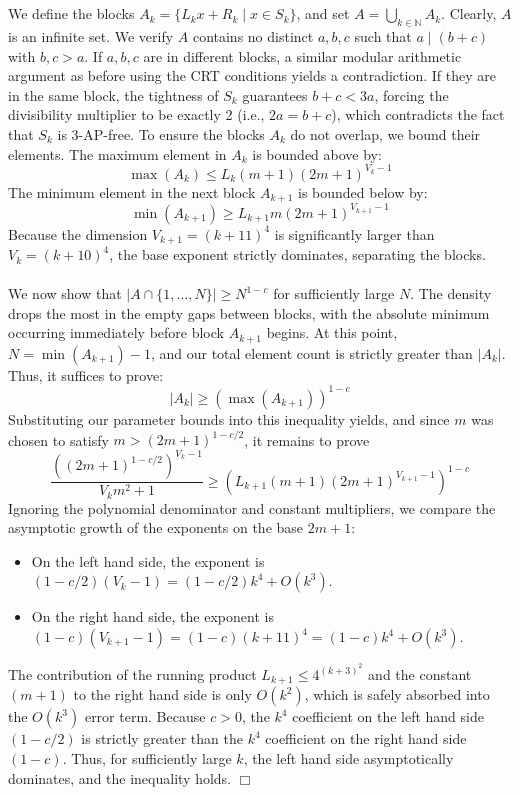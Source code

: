 \\\\
We define the blocks $A_k = \{L_kx + R_k \mid x \in S_k\}$, and set $A = \bigcup_{k \in \mathbb{N}} A_k$. Clearly, $A$ is an infinite set. We verify $A$ contains no distinct $a,b,c$ such that $a \mid (b + c)$ with $b, c > a$. If $a, b, c$ are in different blocks, a similar modular arithmetic argument as before using the CRT conditions yields a contradiction. If they are in the same block, the tightness of $S_k$ guarantees $b+c < 3a$, forcing the divisibility multiplier to be exactly 2 (i.e., $2a = b+c$), which contradicts the fact that $S_k$ is 3-AP-free. To ensure the blocks $A_k$ do not overlap, we bound their elements. The maximum element in $A_k$ is bounded above by:
$$\max(A_k) \leq L_k (m+1)(2m + 1)^{V_k - 1}$$
The minimum element in the next block $A_{k+1}$ is bounded below by:
$$\min(A_{k+1}) \geq L_{k + 1} m(2m + 1)^{V_{k + 1} - 1}$$
Because the dimension $V_{k + 1} = (k + 11)^4$ is significantly larger than $V_k = (k + 10)^4$, the base exponent strictly dominates, separating the blocks.
\\\\
We now show that $|A \cap \{1, \dots, N\}| \geq N^{1-c}$ for sufficiently large $N$. The density drops the most in the empty gaps between blocks, with the absolute minimum occurring immediately before block $A_{k + 1}$ begins. At this point, $N = \min(A_{k+1}) - 1$, and our total element count is strictly greater than $|A_k|$. Thus, it suffices to prove:
$$|A_k| \geq (\max(A_{k + 1}))^{1-c}$$
Substituting our parameter bounds into this inequality yields, and since $m$ was chosen to satisfy $m > (2m + 1)^{1 - c/2}$, it remains to prove
$$\frac{\left((2m+1)^{1-c/2}\right)^{V_k - 1}}{V_k m^2 + 1} \geq \left( L_{k + 1}(m+1)(2m + 1)^{V_{k+1} - 1} \right)^{1-c}$$
Ignoring the polynomial denominator and constant multipliers, we compare the asymptotic growth of the exponents on the base $2m+1$:
\begin{itemize}
    \item On the left hand side, the exponent is $(1 - c/2)(V_k - 1) = (1 - c/2)k^4 + O(k^3)$.
    \item On the right hand side, the exponent is $(1 - c)(V_{k + 1} - 1) = (1 - c)(k + 11)^4 = (1-c)k^4 + O(k^3)$.
\end{itemize}
The contribution of the running product $L_{k + 1} \leq 4^{(k+3)^2}$ and the constant $(m+1)$ to the right hand side is only $O(k^2)$, which is safely absorbed into the $O(k^3)$ error term. Because $c > 0$, the $k^4$ coefficient on the left hand side $(1 - c/2)$ is strictly greater than the $k^4$ coefficient on the right hand side $(1 - c)$. Thus, for sufficiently large $k$, the left hand side asymptotically dominates, and the inequality holds. \hfill $\Box$
